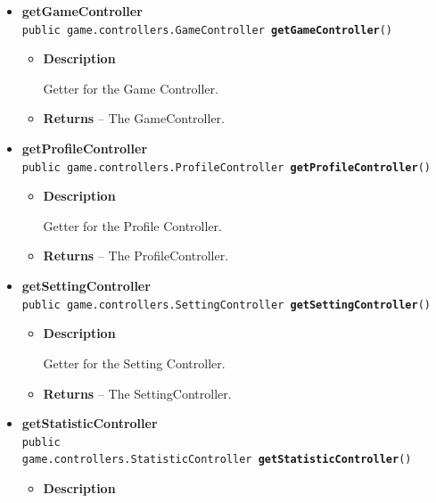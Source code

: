 \documentclass[11pt,a4paper]{report}
\begin{document}
{{{{{{{{{{{\begin{itemize}
{\begin{itemize}
{Initializes the game (all the controllers) after started by the Android Launcher. Afterwards it displays the loading screen to the user. When the game is loaded the main menu appears.
}
\end{itemize}
}%
\item{ 
{\bf  getGameController}\\
\texttt{public game.controllers.GameController\ {\bf  getGameController}()
\label{com.retroMachines.RetroMachines.getGameController()}}%
\begin{itemize}
\item{
{\bf  Description}

Getter for the Game Controller.
}
\item{{\bf  Returns} -- 
The GameController. 
}%
\end{itemize}
}%
\item{ 
{\bf  getProfileController}\\
\texttt{public game.controllers.ProfileController\ {\bf  getProfileController}()
\label{com.retroMachines.RetroMachines.getProfileController()}}%
\begin{itemize}
\item{
{\bf  Description}

Getter for the Profile Controller.
}
\item{{\bf  Returns} -- 
The ProfileController. 
}%
\end{itemize}
}%
\item{ 
{\bf  getSettingController}\\
\texttt{public game.controllers.SettingController\ {\bf  getSettingController}()
\label{com.retroMachines.RetroMachines.getSettingController()}}%
\begin{itemize}
\item{
{\bf  Description}

Getter for the Setting Controller.
}
\item{{\bf  Returns} -- 
The SettingController. 
}%
\end{itemize}
}%
\item{ 
{\bf  getStatisticController}\\
\texttt{public game.controllers.StatisticController\ {\bf  getStatisticController}()
\label{com.retroMachines.RetroMachines.getStatisticController()}}%
\begin{itemize}
\item{
{\bf  Description}

}
\end{itemize}}
\end{itemize}}}}}}}}}}}}
\end{document}
